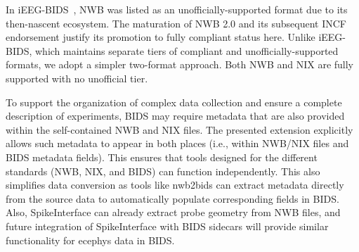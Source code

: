 \documentclass[fleqn,10pt]{article}
\begin{document}
In iEEG-BIDS~\citep{holdgraf_ieeg-bids_2019}, NWB was listed as an unofficially-supported format due to its then-nascent ecosystem.
The maturation of NWB 2.0 and its subsequent INCF endorsement justify its promotion to fully compliant status here.
Unlike iEEG-BIDS, which maintains separate tiers of compliant and unofficially-supported formats, we adopt a simpler two-format approach.
Both NWB and NIX are fully supported with no unofficial tier.

To support the organization of complex data collection and ensure a complete description of experiments, BIDS may require metadata that are also provided within the self-contained NWB and NIX files. The presented extension explicitly allows such metadata to appear in both places (i.e., within NWB/NIX files and BIDS metadata fields). This ensures that tools designed for the different standards (NWB, NIX, and BIDS) can function independently. This also simplifies data conversion as tools like nwb2bids can extract metadata directly from the source data to automatically populate corresponding fields in BIDS. Also, SpikeInterface can already extract probe geometry from NWB files, and future integration of SpikeInterface with BIDS sidecars will provide similar functionality for ecephys data in BIDS.


\end{document}

